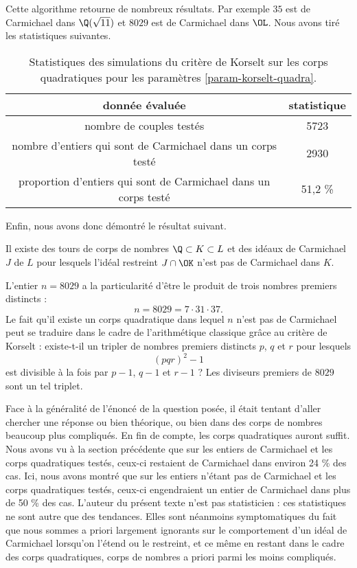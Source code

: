 Cette algorithme retourne de nombreux résultats. Par exemple $35$ est de Carmichael dans $\Q(\sqrt{11})$ et $8029$ est de Carmichael dans $\OL$.  Nous avons tiré les statistiques suivantes.

\begin{table}[H]
	\begin{center}
		\begin{tabular}{|c|c|}
			\hline
			donnée évaluée & statistique \\
			\hline
			\hline
			nombre de couples testés & 5723 \\\hline
			nombre d'entiers qui sont de Carmichael dans un corps testé & 2930 \\\hline
			proportion d'entiers qui sont de Carmichael dans un corps testé & 51,2 \% \\\hline
		\end{tabular}
		\caption{Statistiques des simulations du critère de Korselt sur les corps quadratiques pour les paramètres \ref{param-korselt-quadra}.}
	\end{center}
\end{table}

Enfin, nous avons donc démontré le résultat suivant.

\begin{proposition}\label{deuxieme-ce}
	Il existe des tours de corps de nombres $\Q\subset K \subset L$ et des idéaux de Carmichael $J$ de $L$ pour lesquels l'idéal restreint $J\cap \OK$ n'est pas de Carmichael dans $K$.
\end{proposition}

\begin{remarque}
L'entier $n = 8029$ a la particularité d'être le produit de trois nombres premiers distincts : \[n = 8029 = 7 \cdot 31 \cdot 37.\] Le fait qu'il existe un corps quadratique dans lequel $n$ n'est pas de Carmichael peut se traduire dans le cadre de l'arithmétique classique grâce au critère de Korselt : existe-t-il un tripler de nombres premiers distincts $p$, $q$ et $r$ pour lesquels \[(pqr)^2 - 1\] est divisible à la fois par $p-1$, $q-1$ et $r-1$ ? Les diviseurs premiers de $8029$ sont un tel triplet.
\end{remarque}

Face à la généralité de l'énoncé de la question posée, il était tentant d'aller chercher une réponse ou bien théorique, ou bien dans des corps de nombres beaucoup plus compliqués. En fin de compte, les corps quadratiques auront suffit. Nous avons vu à la section précédente que sur les entiers de Carmichael et les corps quadratiques testés, ceux-ci restaient de Carmichael dans environ 24 \% des cas. Ici, nous avons montré que sur les entiers n'étant pas de Carmichael et les corps quadratiques testés, ceux-ci engendraient un entier de Carmichael dans plus de 50 \% des cas. L'auteur du présent texte n'est pas statisticien : ces statistiques ne sont autre que des tendances. Elles sont néanmoins symptomatiques du fait que nous sommes a priori largement ignorants sur le comportement d'un idéal de Carmichael lorsqu'on l'étend ou le restreint, et ce même en restant dans le cadre des corps quadratiques, corps de nombres a priori parmi les moins compliqués.
